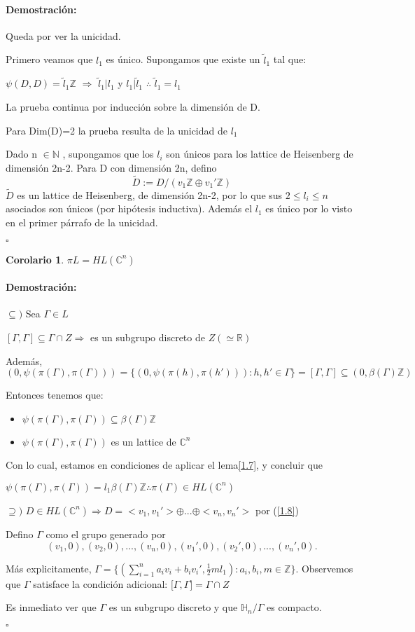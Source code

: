 \documentclass[12pt]{article}
\newtheorem{corollary}{Corolario}
\newenvironment{proof}{\paragraph{Demostración:}}{\hfill$\square$}
\begin{document}
\begin{proof}
Queda por ver la unicidad.

Primero veamos que $l_1$ es único. Supongamos que  existe un $\tilde{l}_1$ tal que: 

$\psi(D,D)=\tilde{l}_1 \mathbb{Z}$ $\Rightarrow$ $\tilde{l}_1 | l_1$ y $l_1 | \tilde{l}_1$ $\therefore$ $\tilde{l}_1=l_1$

La prueba continua por inducción sobre la dimensión de D.

Para Dim(D)=2 la prueba resulta de la unicidad de $l_1$

Dado n $\in \mathbb{N}$ , supongamos que los $l_i$ son únicos para los lattice de Heisenberg de dimensión 2n-2.
Para D con dimensión 2n, defino 
$$\tilde{D}:=D/(v_1 \mathbb{Z} \oplus v_1' \mathbb{Z})$$
$\tilde{D}$ es un lattice de Heisenberg, de dimensión 2n-2, por lo que sus $2\leq l_i\leq n$ asociados son únicos
(por hipótesis inductiva). Además el $l_1$ es único por lo visto en el primer párrafo de la unicidad.

 \end{proof}
 
 \begin{corollary}
  $\pi L = HL(\mathbb{C}^n)$
 \end{corollary}
 \begin{proof}
$\subseteq)$ Sea $\Gamma \in L$

$[\Gamma,\Gamma] \subseteq \Gamma \cap Z \Rightarrow$ es un subgrupo discreto de $Z (\simeq \mathbb{R})$

Además, $(0,\psi(\pi(\Gamma),\pi(\Gamma))) = \{(0,\psi(\pi(h),\pi(h'))): h,h' \in \Gamma\} = [\Gamma,\Gamma] \subseteq (0,\beta(\Gamma) \mathbb{Z})$

Entonces tenemos que:
\begin{itemize}
 \item $\psi(\pi(\Gamma),\pi(\Gamma)) \subseteq \beta(\Gamma) \mathbb{Z}$
 \item $\psi(\pi(\Gamma),\pi(\Gamma))$ es un lattice de $\mathbb{C}^n$
\end{itemize}

Con lo cual, estamos en condiciones de aplicar el lema\ref{1.7}, y concluir que 

$\psi(\pi(\Gamma),\pi(\Gamma))=l_1 \beta(\Gamma) \mathbb{Z} \therefore \pi(\Gamma) \in HL(\mathbb{C}^n) $
\newline

$\supseteq)$ $D\in HL(\mathbb{C}^n) \Rightarrow D=<v_1,v_1'>\oplus ... \oplus <v_n,v_n'>$ por (\ref{1.8}) 

Defino $\Gamma$  como el grupo generado por
$${(v_1,0),(v_2,0),...,(v_n,0),(v_1',0),(v_2',0),...,(v_n',0)}.$$

Más explicitamente, $\Gamma=\{(\sum_{i=1}^n a_i v_i + b_i v_i', \frac{1}{2} m l_1):a_i,b_i,m \in \mathbb{Z} \}$.
Observemos que $\Gamma$ satisface la condición adicional: ${[}\Gamma,\Gamma{]}= \Gamma \cap Z$

Es inmediato ver que $\Gamma$ es un subgrupo discreto y que $\mathbb{H}_n / \Gamma$ es compacto.

 \end{proof}
\end{document}
